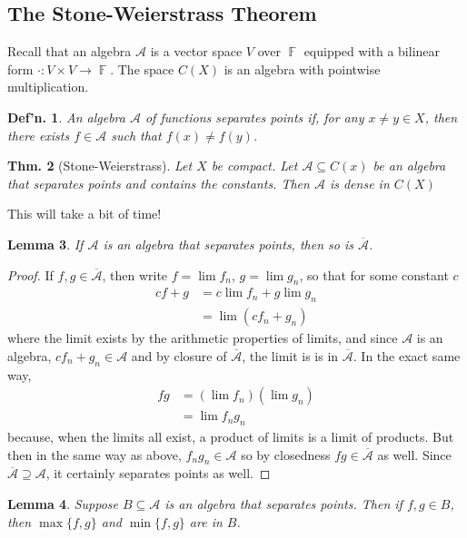 \documentclass[12pt, a4paper]{book}
\DeclareMathOperator{\F}{\mathbb{F}}
\newtheorem{theorem}{Thm.}[section]
\newtheorem{lemma}[theorem]{Lemma}
\newtheorem{definition}[theorem]{Def'n.}
\theoremstyle{nonumberplain}
\newtheorem{proof}{Proof}
\begin{document}
\subsection{The Stone-Weierstrass Theorem}
Recall that an algebra $\mathcal{A}$ is a vector space $V$ over $\F$ equipped with a bilinear form $\cdot:V\times V\to\F$.
The space $C(X)$ is an algebra with pointwise multiplication.
\begin{definition}
    An algebra $\mathcal{A}$ of functions separates points if, for any $x\neq y\in X$, then there exists $f\in\mathcal{A}$ such that $f(x)\neq f(y)$.
\end{definition}
\begin{theorem}[Stone-Weierstrass]
    Let $X$ be compact.
    Let $\mathcal{A}\subseteq C(x)$ be an algebra that separates points and contains the constants.
    Then $\mathcal{A}$ is dense in $C(X)$
\end{theorem}
This will take a bit of time!
\begin{lemma}
    If $\mathcal{A}$ is an algebra that separates points, then so is $\overline{\mathcal{A}}$.
\end{lemma}
\begin{proof}
    If $f,g\in\overline{\mathcal{A}}$, then write $f=\lim f_n$, $g=\lim g_n$, so that for some constant $c$
    \begin{align*}
        cf+g &= c\lim f_n+g\lim g_n\\
             &= \lim (cf_n+g_n)
    \end{align*}
    where the limit exists by the arithmetic properties of limits, and since $\mathcal{A}$ is an algebra, $cf_n+g_n\in\mathcal{A}$ and by closure of $\overline{\mathcal{A}}$, the limit is is in $\overline{\mathcal{A}}$.
    In the exact same way,
    \begin{align*}
        fg &= (\lim f_n)(\lim g_n)\\
           &= \lim f_ng_n
    \end{align*}
    because, when the limits all exist, a product of limits is a limit of products.
    But then in the same way as above, $f_ng_n\in\mathcal{A}$ so by closedness $fg\in\overline{\mathcal{A}}$ as well.
    Since $\overline{\mathcal{A}}\supseteq\mathcal{A}$, it certainly separates points as well.
\end{proof}
\begin{lemma}
    Suppose $B\subseteq\mathcal{A}$ is an algebra that separates points.
    Then if $f,g\in B$, then $\max\{f,g\}$ and $\min\{f,g\}$ are in $B$.
\end{lemma}
\end{document}
